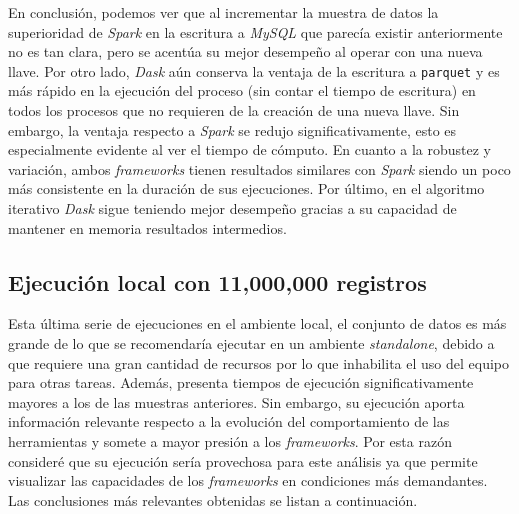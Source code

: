 En conclusión, podemos ver que al incrementar la muestra de datos la superioridad de \textit{Spark} en la escritura a \textit{MySQL} que parecía existir anteriormente no es tan clara, pero se acentúa su mejor desempeño al operar con una nueva llave. Por otro lado, \textit{Dask} aún conserva la ventaja de la escritura a \texttt{parquet} y es más rápido en la ejecución del proceso (sin contar el tiempo de escritura) en todos los procesos que no requieren de la creación de una nueva llave. Sin embargo, la ventaja respecto a \textit{Spark} se redujo significativamente, esto es especialmente evidente al ver el tiempo de cómputo. En cuanto a la robustez y variación, ambos \textit{frameworks} tienen resultados similares con \textit{Spark} siendo un poco más consistente en la duración de sus ejecuciones. Por último, en el algoritmo iterativo \textit{Dask} sigue teniendo mejor desempeño gracias a su capacidad de mantener en memoria resultados intermedios.

\subsection{Ejecución local con 11,000,000 registros}

Esta última serie de ejecuciones en el ambiente local, el conjunto de datos es más grande de lo que se recomendaría ejecutar en un ambiente \textit{standalone}, debido a que requiere una gran cantidad de recursos por lo que inhabilita el uso del equipo para otras tareas. Además, presenta tiempos de ejecución significativamente mayores a los de las muestras anteriores. Sin embargo, su ejecución aporta información relevante respecto a la evolución del comportamiento de las herramientas y somete a mayor presión a los \textit{frameworks}. Por esta razón consideré que su ejecución sería provechosa para este análisis ya que permite visualizar las capacidades de los \textit{frameworks} en condiciones más demandantes. Las conclusiones más relevantes obtenidas se listan a continuación.

